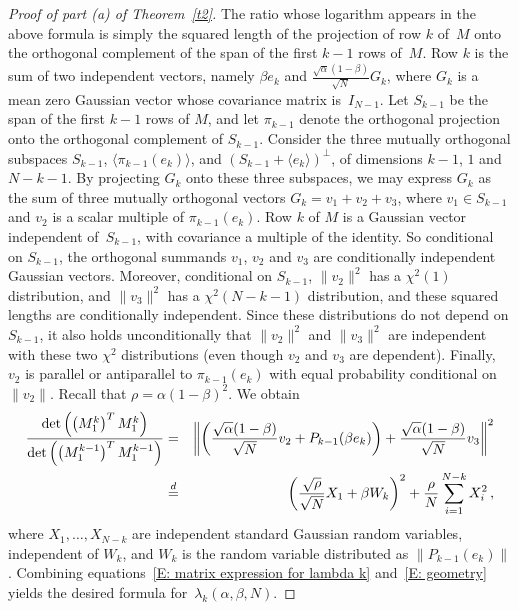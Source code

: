 \documentclass[12pt]{article}
\newcommand{\1}{\mathbf{1}}
\begin{document}
\begin{proof}[Proof of part (a) of Theorem~\ref{t2}]
The ratio whose logarithm appears in the above formula is simply the squared length of the projection of row $k$ of~$M$ onto the orthogonal complement of the span of the first $k-1$ rows of~$M$. Row $k$ is the
sum of two independent vectors, namely $\beta e_k$ and $\frac{\sqrt{\alpha}(1-\beta)}{\sqrt{N}}G_k$, where $G_k$ is a mean zero Gaussian vector whose covariance matrix is~$I_{N-1}$. 
%
Let $S_{k-1}$ be the span of the first $k-1$ rows of $M$, and let $\pi_{k-1}$ denote the orthogonal projection onto the orthogonal complement of $S_{k-1}$. {Consider the three mutually orthogonal subspaces $S_{k-1}$, $\langle \pi_{k-1}(e_k) \rangle$, and $(S_{k-1} + \langle e_k \rangle )^\perp$, of dimensions $k-1$, $1$ and $N-k-1$. By projecting $G_k$ onto these three subspaces, we may express $G_k$ as the sum of three mutually orthogonal vectors $G_k = v_1 + v_2 + v_3$, where $v_1 \in S_{k-1}$ and $v_2$ is a scalar multiple of $\pi_{k-1}(e_k)$. Row $k$ of $M$ is a Gaussian vector independent of~$S_{k-1}$, with covariance a multiple of the identity. So conditional on $S_{k-1}$, the orthogonal summands $v_1$, $v_2$ and $v_3$ are conditionally independent Gaussian vectors. Moreover, conditional on $S_{k-1}$, $\|v_2\|^2$ has a $\chi^2(1)$ distribution, and $\|v_3\|^2$ has a $\chi^2(N-k-1)$ distribution, and these squared lengths are conditionally independent. Since these distributions do not depend on $S_{k-1}$, it  also holds unconditionally that $\|v_2\|^2$ and $\|v_3\|^2$ are independent with these two $\chi^2$ distributions (even though $v_2$ and $v_3$ are dependent).} Finally, $v_2$ is parallel or antiparallel to $\pi_{k-1}(e_k)$ with equal probability conditional on $\|v_2\|$. Recall that $\rho = \alpha(1-\beta)^2$. 
We obtain
\begin{eqnarray}\label{E: geometry}\frac{\det \left(\left(M_1^k\right)^T M_1^k\right)}{\det \left(\left(M_1^{k-1}\right)^T M_1^{k-1}\right) } & = & \left\| \left(\frac{\sqrt{\alpha}(1-\beta)}{\sqrt{N}}v_2 + P_{k-1}(\beta e_k)\right) + \frac{\sqrt{\alpha}(1-\beta)}{\sqrt{N}}v_3\right\|^2 \notag \\ & \stackrel{d}{=} & \left( \frac{\sqrt{\rho}}{\sqrt{N}} X_1 + \beta W_k\right)^2 + {\frac{\rho}{N}}\sum_{i=1}^{N-k} X_i^2\,,\end{eqnarray}
where $X_1, \dots, X_{N-k}$ are independent standard Gaussian random variables, independent of $W_k$,  and $W_k$ is the random variable distributed as $\|P_{k-1}(e_k)\|$. Combining equations~\eqref{E: matrix expression for lambda k} and~\eqref{E: geometry} yields the desired formula for~$\lambda_k(\alpha,\beta,N)$.
\end{proof}
\end{document}
